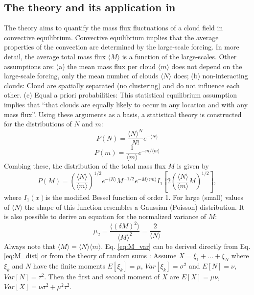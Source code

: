 \documentclass[a4paper, 12pt]{article}
\begin{document}
\subsection{The \cite{Craig2006} theory and its application in \cite{Plant2008}} 
The \cite[][CC06]{Craig2006} theory aims to quantify the mass flux fluctuations of a cloud field in convective equilibrium. Convective equilibrium implies that the average properties of the convection are determined by the large-scale forcing. In more detail, the average total mass flux $\langle M \rangle$ is a function of the large-scales. Other assumptions are: (a) the mean mass flux per cloud $\langle m \rangle$ does not depend on the large-scale forcing, only the mean number of clouds $\langle N \rangle$ does; (b) non-interacting clouds: Cloud are spatially separated (no clustering) and do not influence each other. (c) Equal a priori probabilities: This statistical equilibrium assumption implies that ``that clouds are equally likely to occur in any location and with any mass flux''. Using these arguments as a basis, a statistical theory is constructed for the distributions of $N$ and $m$:
\begin{equation} \label{eq:N_dist}
 P(N) = \frac{\langle N \rangle^N}{N!}e^{-\langle N \rangle}
\end{equation}
\begin{equation} \label{eq:m_dist}
 P(m) = \frac{1}{\langle m \rangle}e^{-m/\langle m \rangle}
\end{equation}
Combing these, the distribution of the total mass flux $M$ is given by
\begin{equation} \label{eq:M_dist}
 P(M) = \left( \frac{\langle N \rangle}{\langle m \rangle} \right)^{1/2} e^{-\langle N \rangle} M^{-1/2} e^{-M/\langle m \rangle} I_1\left[ 2 \left( \frac{\langle N \rangle}{\langle m \rangle} M \right)^{1/2} \right],
\end{equation}
where $I_1(x)$is the modified Bessel function of order 1. For large (small) values of $\langle N \rangle$ the shape of this function resembles a Gaussian (Poisson) distribution.   
It is also possible to derive an equation for the normalized variance of $M$:
\begin{equation} \label{eq:M_var}
 \mu_2 = \frac{\langle (\delta M)^2 \rangle}{\langle M \rangle^2} = \frac{2}{\langle N \rangle}
\end{equation}
Always note that $\langle M \rangle = \langle N \rangle \langle m \rangle$. Eq. \ref{eq:M_var} can be derived directly from Eq. \ref{eq:M_dist} or from the theory of random sums \cite[][p.70ff]{Taylor1998}:
Assume $X=\xi_1 + ... + \xi_N$ where $\xi_k$ and $N$ have the finite moments $E[\xi_k]=\mu$, $Var[\xi_k]=\sigma^2$ and $E[N]=\nu$, $Var[N]=\tau^2$. Then the first and second moment of $X$ are $E[X]=\mu\nu$, $Var[X]=\nu\sigma^2 + \mu^2\tau^2$.
\end{document}
